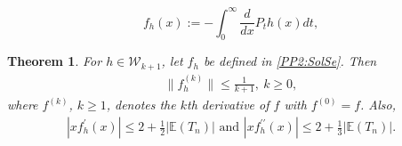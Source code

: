 \documentclass[10pt,a4paper]{amsart}
\newtheorem{thm}{Theorem}
\begin{document}
	\begin{equation}\label{PP2:SolSe}
	f_{h}(x):=-\displaystyle
	\int_{0}^{\infty}\frac{d}{dx}P_{t}h(x)dt,
	\end{equation}

\begin{thm}\label{th3}
	For $h\in\mathcal{W}_{k+1}$, let $f_{h}$ be defined in \eqref{PP2:SolSe}. Then
	\begin{align}\label{PP2:pr1}
	\|f_{h}^{(k)}\|\leq \frac{1}{k+1} ,~k\geq 0,
	\end{align}	
	where $f^{(k)}$, $k\geq 1$, denotes the $k$th derivative of $f$ with $f^{(0)}=f$. Also,
	\begin{align}
		|xf_{h}^{\prime}(x)| \leq 2+\frac{1}{2}|\mathbb{E}(T_n)| \text{ and }|xf_{h}^{\prime\prime}(x)| \leq 2+\frac{1}{3}|\mathbb{E}(T_n)|.
	\end{align}
\end{thm}
\end{document}

